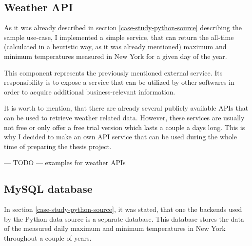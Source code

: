 \subsection{Weather API}

As it was already described in section \ref{case-study-python-source} describing the sample use-case, I implemented a simple service, that can return the all-time (calculated in a heuristic way, as it was already mentioned) maximum and minimum temperatures measured in New York for a given day of the year.

This component represents the previously mentioned external service. Its responsibility is to expose a service that can be utilized by other softwares in order to acquire additional business-relevant information.

It is worth to mention, that there are already several publicly available APIs that can be used to retrieve weather related data. However, these services are usually not free or only offer a free trial version which lasts a couple a days long. This is why I decided to make an own API service that can be used during the whole time of preparing the thesis project.

\begin{center}
	--- TODO ---
	examples for weather APIs
\end{center}

\subsection{MySQL database}

In section \ref{case-study-python-source}, it was stated, that one the backends used by the Python data source is a separate database. This database stores the data of the measured daily maximum and minimum temperatures in New York throughout a couple of years.




